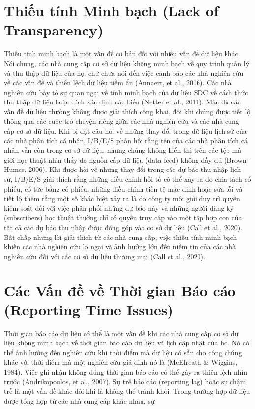 \section{Thiếu tính Minh bạch (Lack of Transparency)}

Thiếu tính minh bạch là một vấn đề cơ bản đối với nhiều vấn đề dữ liệu khác. Nói chung, các nhà cung cấp cơ sở dữ liệu không minh bạch về quy trình quản lý và thu thập dữ liệu của họ, chứ chưa nói đến việc cảnh báo các nhà nghiên cứu về các vấn đề và thiên lệch dữ liệu tiềm ẩn (Annaert, et al., 2016). Các nhà nghiên cứu bày tỏ sự quan ngại về tính minh bạch của dữ liệu SDC về cách thức thu thập dữ liệu hoặc cách xác định các biến (Netter et al., 2011). Mặc dù các vấn đề dữ liệu thường không được giải thích công khai, đôi khi chúng được tiết lộ thông qua các cuộc trò chuyện riêng giữa các nhà nghiên cứu và các nhà cung cấp cơ sở dữ liệu. Khi bị đặt câu hỏi về những thay đổi trong dữ liệu lịch sử của các nhà phân tích cá nhân, I/B/E/S phản hồi rằng tên của các nhà phân tích cá nhân vẫn còn trong cơ sở dữ liệu, nhưng chúng không hiển thị trên các tệp mà giới học thuật nhìn thấy do nguồn cấp dữ liệu (data feed) không đầy đủ (Brown-Humes, 2006). Khi được hỏi về những thay đổi trong các dự báo thu nhập lịch sử, I/B/E/S giải thích rằng những điều chỉnh hồi tố có thể xảy ra do chia tách cổ phiếu, cổ tức bằng cổ phiếu, những điều chỉnh tiền tệ mặc định hoặc sửa lỗi và tiết lộ thêm rằng một số khác biệt xảy ra là do công ty môi giới duy trì quyền kiểm soát đối với việc phân phối những dự báo này và những người đăng ký (subscribers) học thuật thường chỉ có quyền truy cập vào một tập hợp con của tất cả các dự báo thu nhập được đóng góp vào cơ sở dữ liệu (Call et al., 2020). Bất chấp những lời giải thích từ các nhà cung cấp, việc thiếu tính minh bạch khiến các nhà nghiên cứu lo ngại và ảnh hưởng lớn đến niềm tin của các nhà nghiên cứu đối với các cơ sở dữ liệu thương mại (Call et al., 2020).

\section{Các Vấn đề về Thời gian Báo cáo (Reporting Time Issues)}

Thời gian báo cáo dữ liệu có thể là một vấn đề khi các nhà cung cấp cơ sở dữ liệu không minh bạch về thời gian báo cáo dữ liệu và lịch cập nhật của họ. Nó có thể ảnh hưởng đến nghiên cứu khi thời điểm mà dữ liệu có sẵn cho công chúng khác với thời điểm mà một nghiên cứu giả định nó là (McElreath \& Wiggins, 1984). Việc ghi nhận không đúng thời gian báo cáo có thể gây ra thiên lệch nhìn trước (Andrikopoulos, et al., 2007). Sự trễ báo cáo (reporting lag) hoặc sự chậm trễ là một vấn đề khác đôi khi là không thể tránh khỏi. Trong trường hợp dữ liệu được tổng hợp từ các nhà cung cấp khác nhau, sự

